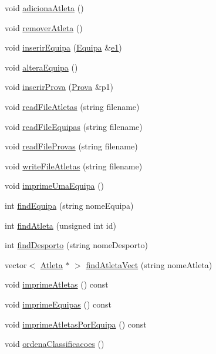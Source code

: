 \begin{DoxyCompactItemize}
void \hyperlink{class_campeonato_a7d63444db444c0d0de2a78db7fbcc20d}{adiciona\+Atleta} ()
\item 
void \hyperlink{class_campeonato_aa81be7f36c3daf7dc1f4d97f4274e953}{remover\+Atleta} ()
\item 
void \hyperlink{class_campeonato_a5c09e9bc272f96875121ef9026c26434}{inserir\+Equipa} (\hyperlink{class_equipa}{Equipa} \&\hyperlink{main_8h_a94bd6f24df224a4dd936a7dba7521ff0}{e1})
\item 
void \hyperlink{class_campeonato_a79600008b0e5fc40b578da54519aee47}{altera\+Equipa} ()
\item 
void \hyperlink{class_campeonato_a44b358a3216e7a1687dfed2a6078551e}{inserir\+Prova} (\hyperlink{class_prova}{Prova} \&p1)
\item 
void \hyperlink{class_campeonato_a4f443b1fb65733062b40dd529d5ad63e}{read\+File\+Atletas} (string filename)
\item 
void \hyperlink{class_campeonato_a93f60ccc2608b0c99a978bc93fd881ac}{read\+File\+Equipas} (string filename)
\item 
void \hyperlink{class_campeonato_a4098bb3bde66ead9ecaa61e10aef2a5e}{read\+File\+Provas} (string filename)
\item 
void \hyperlink{class_campeonato_a8102c353a574b0ada7d35b537365a54e}{write\+File\+Atletas} (string filename)
\item 
void \hyperlink{class_campeonato_a47a2b89c44b6705afa2478109d8b6b78}{imprime\+Uma\+Equipa} ()
\item 
int \hyperlink{class_campeonato_a8002616a409e12a1ba2798d60c04f9dc}{find\+Equipa} (string nome\+Equipa)
\item 
int \hyperlink{class_campeonato_a662db361dc8464fa6ced60048e45ca1a}{find\+Atleta} (unsigned int id)
\item 
int \hyperlink{class_campeonato_a64574dd8d105367c49d794a42e4a2aa8}{find\+Desporto} (string nome\+Desporto)
\item 
vector$<$ \hyperlink{class_atleta}{Atleta} $\ast$ $>$ \hyperlink{class_campeonato_abe0557f6d0fe33787a6d44e85fd8bda3}{find\+Atleta\+Vect} (string nome\+Atleta)
\item 
void \hyperlink{class_campeonato_a6a51ed1d4c6ca51bdc407144589d5894}{imprime\+Atletas} () const 
\item 
void \hyperlink{class_campeonato_a9e43dc72a8bf29c332209a37a8bdb1d8}{imprime\+Equipas} () const 
\item 
void \hyperlink{class_campeonato_a4bbcc137067e9f72c169e22ce1c28858}{imprime\+Atletas\+Por\+Equipa} () const 
\item 
void \hyperlink{class_campeonato_ae1c0453864ac35ca78f076dd33c5c8a2}{ordena\+Classificacoes} ()
\end{DoxyCompactItemize}

